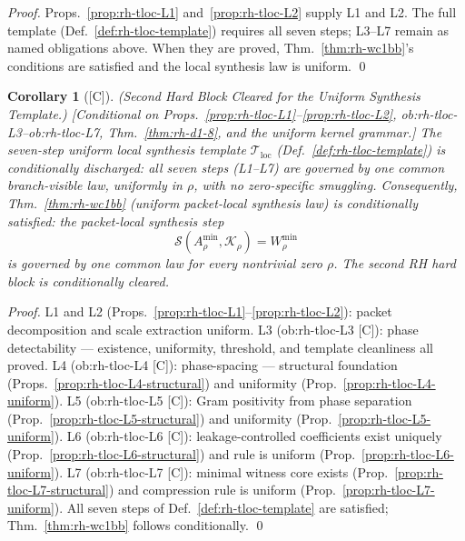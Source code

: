 \documentclass[12pt,oneside]{amsbook}
\theoremstyle{plain}
\newtheorem{corollary}[theorem]{Corollary}
\theoremstyle{definition}
\theoremstyle{remark}
\newcommand{\status}[1]{\textup{[#1]}}
\begin{document}
\begin{proof}
Props.~\ref{prop:rh-tloc-L1} and~\ref{prop:rh-tloc-L2} supply L1
and L2. The full template (Def.~\ref{def:rh-tloc-template})
requires all seven steps; L3--L7 remain as named obligations above.
When they are proved, Thm.~\ref{thm:rh-wc1bb}'s conditions are
satisfied and the local synthesis law is uniform. \qed
\end{proof}

\begin{corollary}[\status{C}]\label{cor:rh-second-hard-block-cleared}
\textup{(Second Hard Block Cleared for the Uniform Synthesis Template.)}
\textup{[Conditional on Props.~\ref{prop:rh-tloc-L1}--\ref{prop:rh-tloc-L2},
ob:rh-tloc-L3--ob:rh-tloc-L7, Thm.~\ref{thm:rh-d1-8}, and the
uniform kernel grammar.]}
The seven-step uniform local synthesis template
$\mathcal{T}_{\mathrm{loc}}$ (Def.~\ref{def:rh-tloc-template}) is
conditionally discharged: all seven steps (L1--L7) are governed by
one common branch-visible law, uniformly in $\rho$, with no
zero-specific smuggling. Consequently, Thm.~\ref{thm:rh-wc1bb}
(uniform packet-local synthesis law) is conditionally satisfied:
the packet-local synthesis step
\[
 \mathcal{S}(A_\rho^{\min}, \mathcal{K}_\rho) = W_\rho^{\min}
\]
is governed by one common law for every nontrivial zero $\rho$.
The second RH hard block is conditionally cleared.
\end{corollary}

\begin{proof}
L1 and L2 (Props.~\ref{prop:rh-tloc-L1}--\ref{prop:rh-tloc-L2}):
packet decomposition and scale extraction uniform.
L3 (ob:rh-tloc-L3 [C]): phase detectability — existence, uniformity,
threshold, and template cleanliness all proved.
L4 (ob:rh-tloc-L4 [C]): phase-spacing — structural foundation
(Props.~\ref{prop:rh-tloc-L4-structural}) and uniformity
(Prop.~\ref{prop:rh-tloc-L4-uniform}).
L5 (ob:rh-tloc-L5 [C]): Gram positivity from phase separation
(Prop.~\ref{prop:rh-tloc-L5-structural}) and uniformity
(Prop.~\ref{prop:rh-tloc-L5-uniform}).
L6 (ob:rh-tloc-L6 [C]): leakage-controlled coefficients exist
uniquely (Prop.~\ref{prop:rh-tloc-L6-structural}) and rule is
uniform (Prop.~\ref{prop:rh-tloc-L6-uniform}).
L7 (ob:rh-tloc-L7 [C]): minimal witness core exists
(Prop.~\ref{prop:rh-tloc-L7-structural}) and compression rule is
uniform (Prop.~\ref{prop:rh-tloc-L7-uniform}).
All seven steps of Def.~\ref{def:rh-tloc-template} are satisfied;
Thm.~\ref{thm:rh-wc1bb} follows conditionally. \qed
\end{proof}
\end{document}
